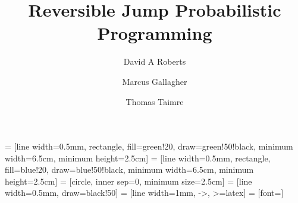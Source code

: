 \documentclass[final]{beamer}
\title{Reversible Jump Probabilistic Programming}
\author{David A Roberts \and Marcus Gallagher \and Thomas Taimre}
\institute{\url{https://davidar.github.io/stochaskell}}
\newlength{\sepwidth}
\begin{document}
{
}

 = [line width=0.5mm, rectangle, fill=green!20, draw=green!50!black, minimum width=6.5cm, minimum height=2.5cm]
 = [line width=0.5mm, rectangle, fill=blue!20, draw=blue!50!black, minimum width=6.5cm, minimum height=2.5cm]
 = [circle, inner sep=0, minimum size=2.5cm]
 = [line width=0.5mm, draw=black!50]
 = [line width=1mm, ->, >=latex]
 = [font=\small]
\end{document}
